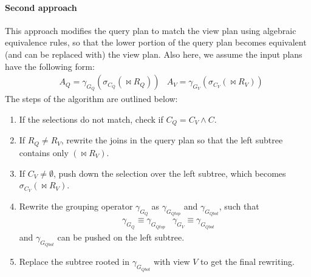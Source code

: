 \paragraph{Second approach} This approach modifies the query plan to match the view plan using algebraic equivalence rules, so that the lower portion of the query plan becomes equivalent (and can be replaced with) the view plan. Also here, we assume the input plans have the following form:
\begin{align*}
        &A_Q = \gamma_{G_Q}(\sigma_{C_Q}(\bowtie R_Q)) &A_V = \gamma_{G_V}(\sigma_{C_V}(\bowtie R_V))
\end{align*}
The steps of the algorithm are outlined below:
\begin{enumerate}
    \item If the selections do not match, check if $C_Q = C_V \land C$.
    \item If $R_Q \neq R_V$, rewrite the joins in the query plan so that the left subtree contains only $(\bowtie R_V)$.
    \item If $C_V \neq \emptyset$, push down the selection over the left subtree, which becomes $\sigma_{C_V}(\bowtie R_V)$.
    \item Rewrite the grouping operator $\gamma_{G_Q}$ as $\gamma_{G_{Q\textit{top}}}$ and $\gamma_{G_{Q\textit{bot}}}$, such that
    \begin{align*}
        &\gamma_{G_Q} \equiv \gamma_{G_{Q\textit{top}}} &\gamma_{G_V} \equiv \gamma_{G_{Q\textit{bot}}}
    \end{align*}
    and $\gamma_{G_{Q\textit{bot}}}$ can be pushed on the left subtree.
    \item Replace the subtree rooted in $\gamma_{G_{Q\textit{bot}}}$ with view $V$ to get the final rewriting.
\end{enumerate}